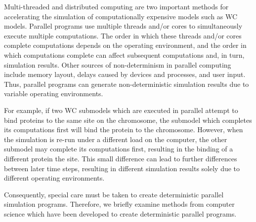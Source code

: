\documentclass[journal,transmag,twoside]{IEEEtran}
\begin{document}
Multi-threaded and distributed computing are two important methods for accelerating the simulation of computationally expensive models such as WC models. Parallel programs use multiple threads and/or cores to simultaneously execute multiple computations. The order in which these threads and/or cores complete computations depends on the operating environment, and the order in which computations complete can affect subsequent computations and, in turn, simulation results. Other sources of non-determinism in parallel computing include memory layout, delays caused by devices and processes, and user input. Thus, parallel programs can generate non-deterministic simulation results due to variable operating environments.

For example, if two WC submodels which are executed in parallel attempt to bind proteins to the same site on the chromosome, the submodel which completes its computations first will bind the protein to the chromosome. However, when the simulation is re-run under a different load on the computer, the other submodel may complete its computations first, resulting in the binding of a different protein the site. This small difference can lead to further differences between later time steps, resulting in different simulation results solely due to different operating environments.

Consequently, special care must be taken to create deterministic parallel simulation programs. Therefore, we briefly examine methods from computer science which have been developed to create deterministic parallel programs.
\end{document}
